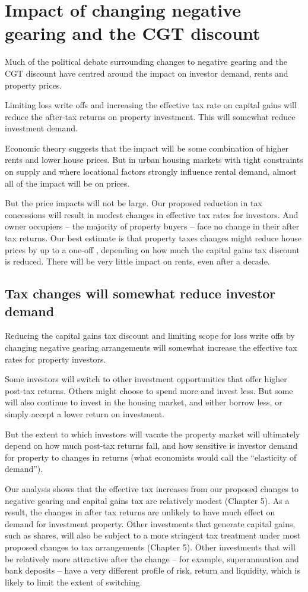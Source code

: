 \documentclass{grattan}\usepackage[]{graphicx}\usepackage[]{color}
\begin{document}
\chapter{Impact of changing negative gearing and the CGT discount}
Much of the political debate surrounding changes to negative gearing and the CGT discount have centred around the impact on investor demand, rents and property prices. 

Limiting loss write offs and increasing the effective tax rate on capital gains will reduce the after-tax returns on property investment. This will somewhat reduce investment demand. 

Economic theory suggests that the impact will be some combination of higher rents and lower house prices. But in urban housing markets with tight constraints on supply and where locational factors strongly influence rental demand, almost all of the impact will be on prices.  

But the price impacts will not be large. Our proposed reduction in tax concessions will result in modest changes in effective tax rates for investors. And owner occupiers -- the majority of property buyers -- face no change in their after tax returns. Our best estimate is that property taxes changes might reduce house prices by up to a one-off , depending on how much the capital gains tax discount is reduced. There will be very little impact on rents, even after a decade.

\section{Tax changes will somewhat reduce investor demand}
Reducing the capital gains tax discount and limiting scope for loss write offs by changing negative gearing arrangements will somewhat increase the effective tax rates for property investors. 

Some investors will switch to other investment opportunities that offer higher post-tax returns. Others might choose to spend more and invest less. But some will also continue to invest in the housing market, and either borrow less, or simply accept a lower return on investment.

But the extent to which investors will vacate the property market will ultimately depend on how much post-tax returns fall, and how sensitive is investor demand for property to changes in returns (what economists would call the ``elasticity of demand”).

Our analysis shows that the effective tax increases from our proposed changes to negative gearing and capital gains tax are relatively modest (Chapter 5). 
As a result, the changes in after tax returns are unlikely to have much effect on demand for investment property. Other investments that generate capital gains, such as shares, will also be subject to a more stringent tax treatment under most proposed changes to tax arrangements (Chapter 5). Other investments that will be relatively more attractive after the change -- for example, superannuation and bank deposits -- have a very different profile of risk, return and liquidity, which is likely to limit the extent of switching. 
\end{document}
